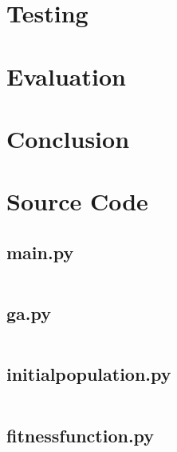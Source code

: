 \documentclass[a4paper, 12pt]{report}
\begin{document}
\chapter{Testing}  %

\chapter{Evaluation}  %

\chapter{Conclusion}  %

\renewcommand\bibname{References}


\appendix

\listoffigures

\listoftables

\listoflistings

\chapter{Source Code}

\section{main.py}
\inputminted[linenos, fontsize=\footnotesize]{Python}{../main.py}

\newpage

\section{ga.py}
\inputminted[linenos, fontsize=\footnotesize]{Python}{../modules/ga.py}

\newpage

\section{initial{\textunderscore}population.py}
\inputminted[linenos, fontsize=\footnotesize]{Python}{
	../modules/initial_population.py}

\newpage

\section{fitness{\textunderscore}function.py}
\inputminted[linenos, fontsize=\footnotesize]{Python}{
	../modules/fitness_function.py}
\end{document}
